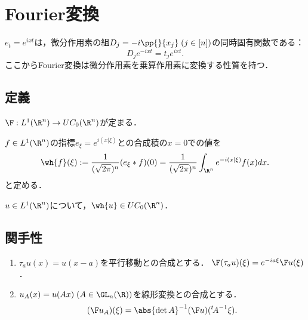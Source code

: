 \documentclass[uplatex, dvipdfmx]{jsreport}
\begin{document}
\section{Fourier変換}

\begin{tcolorbox}[colframe=ForestGreen, colback=ForestGreen!10!white,breakable,colbacktitle=ForestGreen!40!white,coltitle=black,fonttitle=\bfseries\sffamily,
title=]
    $e_t=e^{ixt}$は，微分作用素の組$D_j=-i\pp{}{x_j}\;(j\in[n])$の同時固有関数である：
    \[D_je^{-ixt}=t_je^{ixt}.\]
    ここからFourier変換は微分作用素を乗算作用素に変換する性質を持つ．
\end{tcolorbox}

\subsection{定義}

\begin{tcolorbox}[colframe=ForestGreen, colback=ForestGreen!10!white,breakable,colbacktitle=ForestGreen!40!white,coltitle=black,fonttitle=\bfseries\sffamily,
title=]
    $\F:L^1(\R^n)\to UC_0(\R^n)$が定まる．
\end{tcolorbox}

\begin{definition}
    $f\in L^1(\R^n)$の指標$e_\xi=e^{i(x|\xi)}$との合成積の$x=0$での値を
    \[\wh{f}(\xi):=\frac{1}{(\sqrt{2\pi})^n}(e_\xi*f)(0)=\frac{1}{(\sqrt{2\pi})^n}\int_{\R^n}e^{-i(x|\xi)}f(x)dx.\]
    と定める．
\end{definition}

\begin{theorem}
    $u\in L^1(\R^n)$について，$\wh{u}\in UC_0(\R^n)$．
\end{theorem}

\subsection{関手性}

\begin{theorem}\mbox{}
    \begin{enumerate}
        \item $\tau_au(x)=u(x-a)$を平行移動との合成とする．
        $\F(\tau_au)(\xi)=e^{-ia\xi}\F u(\xi)$．
        \item $u_A(x)=u(Ax)\;(A\in\GL_n(\R))$を線形変換との合成とする．
        \[(\F u_A)(\xi)=\abs{\det A}^{-1}(\F u)({}^t\!A^{-1}\xi).\]
    \end{enumerate}
\end{theorem}
\end{document}
